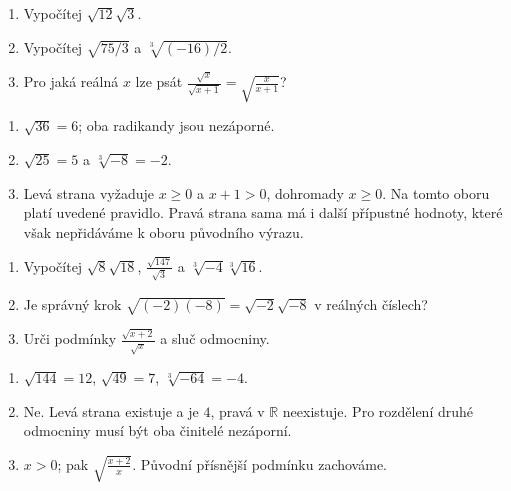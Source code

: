 \documentclass[11pt,a4paper]{article}
\begin{document}
\begin{zadaniReseniBox}[title={Procvičení},breakable=false]
\begin{enumerate}[label=\alph*)]
\item Vypočítej $\sqrt{12}\sqrt3$.
\item Vypočítej $\sqrt{75/3}$ a $\sqrt[3]{(-16)/2}$.
\item Pro jaká reálná $x$ lze psát $\frac{\sqrt x}{\sqrt{x+1}}=\sqrt{\frac{x}{x+1}}$?
\end{enumerate}
\tcblower
\begin{enumerate}[label=\alph*)]
\item $\sqrt{36}=6$; oba radikandy jsou nezáporné.
\item $\sqrt{25}=5$ a $\sqrt[3]{-8}=-2$.
\item Levá strana vyžaduje $x\ge0$ a $x+1>0$, dohromady $x\ge0$. Na tomto oboru platí uvedené pravidlo. Pravá strana sama má i další přípustné hodnoty, které však nepřidáváme k oboru původního výrazu.
\end{enumerate}
\end{zadaniReseniBox}





\begin{zadaniReseniBox}[title={Základ: podmínky jsou součástí pravidla},breakable=false]
\begin{enumerate}[label=\alph*)]
\item Vypočítej $\sqrt8\sqrt{18}$, $\frac{\sqrt{147}}{\sqrt3}$ a $\sqrt[3]{-4}\sqrt[3]{16}$.
\item Je správný krok $\sqrt{(-2)(-8)}=\sqrt{-2}\sqrt{-8}$ v reálných číslech?
\item Urči podmínky $\frac{\sqrt{x+2}}{\sqrt x}$ a sluč odmocniny.
\end{enumerate}
\tcblower
\begin{enumerate}[label=\alph*)]
\item $\sqrt{144}=12$, $\sqrt{49}=7$, $\sqrt[3]{-64}=-4$.
\item Ne. Levá strana existuje a je $4$, pravá v $\mathbb R$ neexistuje. Pro rozdělení druhé odmocniny musí být oba činitelé nezáporní.
\item $x>0$; pak $\sqrt{\frac{x+2}{x}}$. Původní přísnější podmínku zachováme.
\end{enumerate}
\end{zadaniReseniBox}
\end{document}

